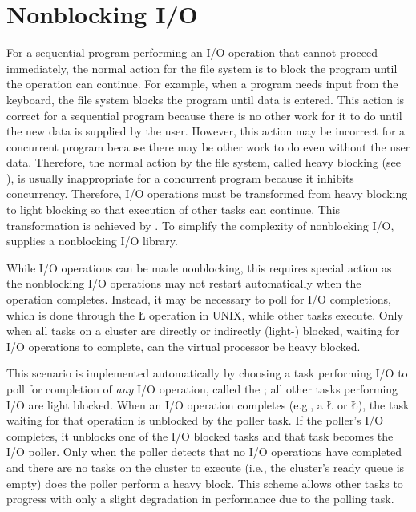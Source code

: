 \documentclass[openright,twoside]{report}
\begin{document}
\section{Nonblocking I/O}
\label{s:NonblockingIO}

For a sequential program performing an I/O operation that cannot proceed immediately, the normal action for the file system is to block the program until the operation can continue.
For example, when a program needs input from the keyboard, the file system blocks the program until data is entered.
This action is correct for a sequential program because there is no other work for it to do until the new data is supplied by the user.
However, this action may be incorrect for a concurrent program because there may be other work to do even without the user data.
Therefore, the normal action by the file system, called heavy blocking (see ), is usually inappropriate for a concurrent program because it inhibits concurrency.
Therefore, I/O operations must be transformed from heavy blocking to light blocking so that execution of other tasks can continue.
This transformation is achieved by .
To simplify the complexity of nonblocking I/O, \uC supplies a nonblocking I/O library.

While I/O operations can be made nonblocking, this requires special action as the nonblocking I/O operations may not restart automatically when the operation completes.
Instead, it may be necessary to poll for I/O completions, which is done through the \LGinlinetrue\LGbegin\lgrinde\L{}\endlgrinde\LGend{} operation in UNIX, while other tasks execute.
Only when all tasks on a cluster are directly or indirectly (light-) blocked, waiting for I/O operations to complete, can the virtual processor be heavy blocked.

This scenario is implemented automatically by \uC choosing a task performing I/O to poll for completion of \emph{any} I/O operation, called the ;
all other tasks performing I/O are light blocked.
When an I/O operation completes (e.g., a \LGinlinetrue\LGbegin\lgrinde\L{}\endlgrinde\LGend{} or \LGinlinetrue\LGbegin\lgrinde\L{}\endlgrinde\LGend{}), the task waiting for that operation is unblocked by the poller task.
If the poller's I/O completes, it unblocks one of the I/O blocked tasks and that task becomes the I/O poller.
Only when the poller detects that no I/O operations have completed and there are no tasks on the cluster to execute (i.e., the cluster's ready queue is empty) does the poller perform a heavy block.
This scheme allows other tasks to progress with only a slight degradation in performance due to the polling task.
\end{document}
